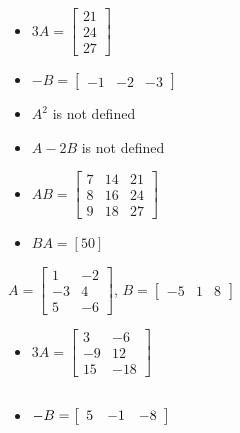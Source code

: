 \documentclass{ximera}
\begin{document}
\begin{question}
\begin{problem}
\begin{solution}
\begin{itemize}
\item  $3A = \left[ \begin{array}{r} 21 \\ 24 \\ 27 \end{array} \right]$

\item $-B = \left[ \begin{array}{rrr} -1 & -2 & -3 \end{array} \right]$

\item $A^2$ is not defined

\item  $A-2B$ is not defined

\item $AB = \left[ \begin{array}{rrr} 7 & 14 & 21 \\ 8 & 16 & 24 \\ 9 & 18 & 27 \end{array} \right]$

\item $BA = [50] $

\end{itemize}
\end{solution}
\end{problem}

\begin{problem}
$A = \left[ \begin{array}{rr} 1 & -2 \\ -3 & 4 \\ 5 & -6 \end{array} \right]$, $B=\left[ \begin{array}{rrr} -5 & 1 & 8 \end{array} \right]$

\begin{solution}
\begin{itemize}
\item  $3A = \left[ \begin{array}{rr} 3 & -6 \\ -9 & 12 \\ 15 & -18 \end{array} \right]$

\item $-B = \left[ \begin{array}{rrr} 5 & -1 & -8 \end{array} \right] \vphantom{\left[ \begin{array}{rr} 3 & -6 \\ -9 & 12 \\ 15 & -18 \end{array} \right]}$


\end{itemize}
\end{solution}
\end{problem}
\end{question}
\end{document}
